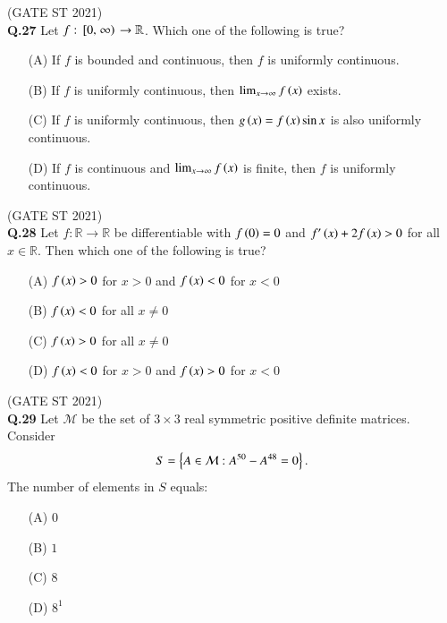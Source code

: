 \documentclass[journal,12pt,onecolumn]{IEEEtran}
\theoremstyle{remark}
\begin{document}
\hfill (GATE ST 2021) \\

\textbf{Q.27}
Let $f: {}\left[0, \left.\infty\right)\right. \to \mathbb{R}$. Which one of the following is true?
\begin{enumerate}
\item[(A)] If $f$ is bounded and continuous, then $f$ is uniformly continuous.
\item[(B)] If $f$ is uniformly continuous, then $\lim_{x \to \infty} f\left(x\right)$ exists.
\item[(C)] If $f$ is uniformly continuous, then $g\left(x\right) = f\left(x\right) \sin x$ is also uniformly continuous.
\item[(D)] If $f$ is continuous and $\lim_{x \to \infty} f\left(x\right)$ is finite, then $f$ is uniformly continuous.
\end{enumerate}

\hfill (GATE ST 2021) \\
\textbf{Q.28}
Let $f: \mathbb{R} \to \mathbb{R}$ be differentiable with $f\left(0\right) = 0$ and $f'\left(x\right) + 2f\left(x\right) > 0$ for all $x \in \mathbb{R}$. Then which one of the following is true?
\begin{enumerate}
\item[(A)] $f\left(x\right) > 0$ for $x > 0$ and $f\left(x\right) < 0$ for $x < 0$
\item[(B)] $f\left(x \right)< 0$ for all $x \neq 0$
\item[(C)] $f\left(x\right) > 0$ for all $x \neq 0$
\item[(D)] $f\left(x\right) < 0$ for $x > 0$ and $f\left(x\right) > 0$ for $x < 0$
\end{enumerate}

\hfill (GATE ST 2021) \\
\textbf{Q.29}
Let $\mathcal{M}$ be the set of $3\times 3$ real symmetric positive definite matrices. Consider  
\[
S = \left\{ A \in \mathcal{M} : A^{50} - A^{48} = 0 \right\}.
\]
The number of elements in $S$ equals:
\begin{enumerate}
\item[(A)] $0$
\item[(B)] $1$
\item[(C)] $8$
\item[(D)] $8^1$
\end{enumerate}
\end{document}
